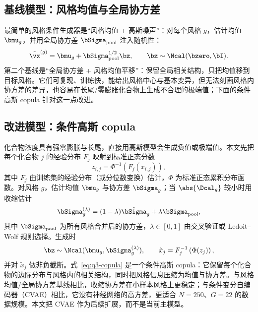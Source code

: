 \subsection{基线模型：风格均值与全局协方差}

最简单的风格条件生成器是“风格均值 + 高斯噪声”：对每个风格 $g$，估计均值 $\bmu_g$，并用全局协方差 $\bSigma_{\mathrm{pool}}$ 注入随机性：
\begin{equation}
  \tilde{\vx}^{(g)}=\bmu_g+\bSigma_{\mathrm{pool}}^{1/2}\bz,\qquad
  \bz\sim\Ncal(\bzero,\bI).
  \label{eq:q3-mean-noise}
\end{equation}
第二个基线是“全局协方差 + 风格均值平移”：保留全局相关结构，只把均值移到目标风格。它们可复现、训练快，能给出风格中心与基本变异，但无法刻画风格内协方差的差异，也容易在长尾/零膨胀化合物上生成不合理的极端值；下面的条件高斯 copula 针对这一点改进。

\subsection{改进模型：条件高斯 copula}

化合物浓度具有强零膨胀与长尾，直接用高斯模型会生成负值或极端值。本文先把每个化合物 $j$ 的经验分布 $F_j$ 映射到标准正态分数
\begin{equation}
  z_{i,j}=\Phi^{-1}\left(F_j(x_{i,j})\right),
  \label{eq:q3-normal-score}
\end{equation}
其中 $F_j$ 由训练集的经验分布（或分位数变换）估计，$\Phi$ 为标准正态累积分布函数。对风格 $g$，估计均值 $\bmu_g$ 与协方差 $\bSigma_g$；当 $\abs{\Dcal_g}$ 较小时用收缩估计
\begin{equation}
  \bSigma_g^{(\lambda)}=(1-\lambda)\hat{\bSigma}_g+\lambda\bSigma_{\mathrm{pool}},
  \label{eq:q3-shrinkage}
\end{equation}
其中 $\bSigma_{\mathrm{pool}}$ 为所有风格合并后的协方差，$\lambda\in[0,1]$ 由交叉验证或 Ledoit--Wolf 规则选择。生成时
\begin{equation}
  \bz\sim\Ncal(\bmu_g,\bSigma_g^{(\lambda)}),\qquad
  \tilde{x}_j=F_j^{-1}\left(\Phi(z_j)\right),
  \label{eq:q3-copula}
\end{equation}
并对 $\tilde{x}_j$ 做非负截断。式~\eqref{eq:q3-copula} 是一个条件高斯 copula：它保留每个化合物的边际分布与风格内的相关结构，同时把风格信息压缩为均值与协方差。与风格均值/全局协方差基线相比，收缩协方差在小样本风格上更稳定；与条件变分自编码器（CVAE）相比，它没有神经网络的高方差，更适合 $N=250$、$G=22$ 的数据规模。本文把 CVAE 作为后续扩展，而不是当前主模型\citep{kingma2014auto,sohn2015learning}。

